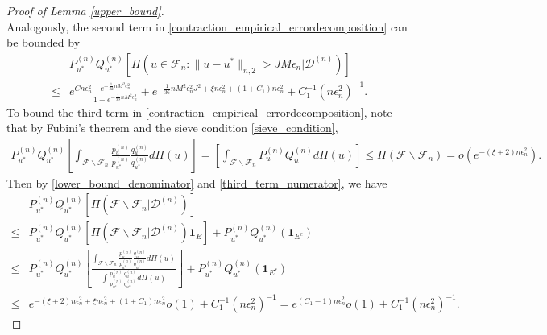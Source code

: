 \documentclass{article}
\newcommand{\F}{\mathcal{F}}
\newcommand{\D}{\mathcal{D}}
\theoremstyle{plain}
\theoremstyle{definition}
\theoremstyle{remark}
\begin{document}
\begin{proof}[Proof of Lemma \ref{upper_bound}]
\begin{equation}
\end{equation}
Analogously, the second term in \eqref{contraction_empirical_errordecomposition} can be bounded by 
\begin{equation} \label{second_term}
    \begin{aligned}
        & P_{u^*}^{(n)} Q_{u^*}^{(n)} \left[\Pi(u \in \F_n:  \|u - u^*\|_{n, 2} >  J M \epsilon_n | \D^{(n)} )\right] \\ \leq &  e^{C n \epsilon_n^2} \frac{e^{-\frac{1}{32}n M^2 \epsilon_n^2}}{1 - e^{-\frac{1}{32}n M^2 \epsilon_n^2}} + e^{-\frac{1}{36} n M^2 \epsilon_{n}^2 J^2 + \xi n\epsilon_n^2 + (1+C_1) n \epsilon_n^2} + C_1^{-1} (n\epsilon_n^2)^{-1}.
    \end{aligned}
\end{equation}
To bound the third term in \eqref{contraction_empirical_errordecomposition}, note that by Fubini's theorem and the sieve condition \eqref{sieve_condition},
\begin{equation} \label{third_term_numerator}
    \begin{aligned}
          P_{u^*}^{(n)} Q_{u^*}^{(n)} \left[\int_{\F \backslash \F_n} \frac{p_{u}^{(n)}}{p_{u^*}^{(n)}} \frac{q_{u}^{(n)}}{q_{u^*}^{(n)}} d \Pi(u)\right] = \left[ \int_{\F \backslash \F_n} P_u^{(n)} Q_u^{(n)} d \Pi(u)  \right] \leq \Pi(\F \backslash \F_n) = o(e^{-(\xi + 2) n \epsilon_n^2}). 
    \end{aligned}
\end{equation}
Then by \eqref{lower_bound_denominator} and \eqref{third_term_numerator}, we have 
\begin{equation} \label{third_term}
    \begin{aligned}
          & P_{u^*}^{(n)} Q_{u^*}^{(n)}\left[\Pi(\F \backslash \F_n | \D^{(n)} )\right] \\
         \leq &  P_{u^*}^{(n)} Q_{u^*}^{(n)}\left[\Pi(\F \backslash \F_n | \D^{(n)} ) \mathbf{1}_E\right] + P_{u^*}^{(n)} Q_{u^*}^{(n)} (\mathbf{1}_{E^c}) \\
         \leq & P_{u^*}^{(n)} Q_{u^*}^{(n)} \left[\frac{\int_{\F \backslash \F_n} \frac{p_{u}^{(n)}}{p_{u^*}^{(n)}} \frac{q_{u}^{(n)}}{q_{u^*}^{(n)}} d \Pi(u)}{\int \frac{p_u^{(n)}}{p_{u^*}^{(n)}} \frac{q_{u}^{(n)}}{q_{u^*}^{(n)}} d \Pi(u)}\right] + P_{u^*}^{(n)} Q_{u^*}^{(n)} (\mathbf{1}_{E^c}) \\
         \leq & e^{-(\xi+2) n\epsilon_n^2 + \xi n\epsilon_n^2 + (1 + C_1) n\epsilon_n^2} o(1) + C_1^{-1} (n\epsilon_n^2)^{-1} = e^{(C_1 - 1) n\epsilon_n^2} o(1)+ C_1^{-1} (n\epsilon_n^2)^{-1}.
    \end{aligned}

\end{equation}
\end{proof}
\end{document}
